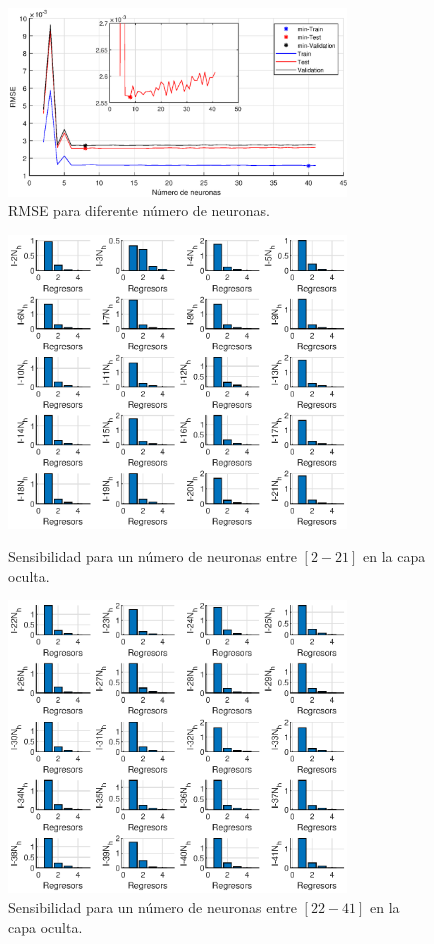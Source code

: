 \documentclass[12pt]{article}
\begin{document}
\begin{itemize}
	\begin{figure}[h!]
		\centering
		\includegraphics[width=0.8\textwidth]{imag/redes/RMSE_full.eps}
		\caption{RMSE para diferente número de neuronas.}
		\label{RMSE_full}
	\end{figure}
	\clearpage
	\begin{figure}[t!]
		\centering
		\includegraphics[width=0.8\textwidth]{imag/redes/sensibilidad_full_1.eps}
		\caption{Sensibilidad para un número de neuronas entre $[2-21]$ en la capa oculta.}
		\label{sensi_red_1}
		\includegraphics[width=0.8\textwidth]{imag/redes/sensibilidad_full_2.eps}
		\caption{Sensibilidad para un número de neuronas entre $[22-41]$ en la capa oculta.}
		\label{sensi_red_2}
	\end{figure}
	

\end{itemize}
\end{document}
